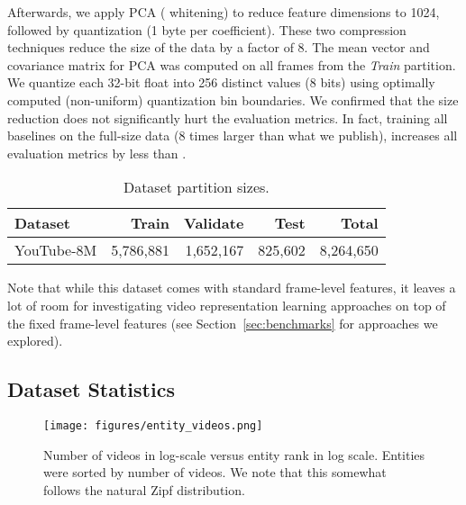\documentclass{sig-alternate-05-2015}
\begin{document}
Afterwards, we apply PCA ( whitening) to reduce feature dimensions to 1024, followed
by quantization (1 byte per coefficient). These two compression techniques reduce the size of the data by a
factor of 8. The mean vector and covariance matrix for PCA was computed on all
frames from the {\it Train} partition.
We quantize each 32-bit float into 256 distinct values (8 bits) using optimally computed (non-uniform) quantization bin boundaries.
We confirmed that the size reduction does not significantly hurt the evaluation metrics. In fact,
training all baselines on the full-size data (8 times larger than what we publish),
increases all evaluation metrics by less than .


\begin{table}
  \begin{tabular}{| l | r | r | r | r |}
    \hline
    Dataset & Train & Validate & Test & Total \\
    \hline \hline
    YouTube-8M & 5,786,881 & 1,652,167 & 825,602 & 8,264,650 \\
\hline
  \end{tabular}
\caption{Dataset partition sizes.}
\label{table:numvideos}
\end{table}

Note that while this dataset comes with standard frame-level features, it leaves
a lot of room for investigating video representation learning approaches on top
of the fixed frame-level features (see Section~\ref{sec:benchmarks} for approaches we explored).




\subsection{Dataset Statistics}
\label{sec:stats}

\begin{figure}
\begin{center}
  \texttt{[image: figures/entity\_videos.png]}
\caption{Number of videos in log-scale versus entity rank in log scale.
         Entities were sorted by number of videos. We note that this somewhat
         follows the natural Zipf distribution.}
\label{fig:entityvideos}
\end{center}
\end{figure}
\end{document}
